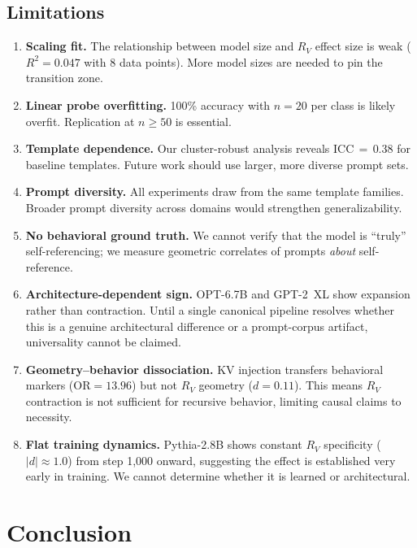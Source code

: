 \documentclass{article}
\newcommand{\RV}{R_V}
\newcommand{\dcohen}{d}
\begin{document}
\subsection{Limitations}

\begin{enumerate}
    \item \textbf{Scaling fit.} The relationship between model size and $\RV$ effect size is weak ($R^2{=}0.047$ with 8 data points). More model sizes are needed to pin the transition zone.
    \item \textbf{Linear probe overfitting.} 100\% accuracy with $n{=}20$ per class is likely overfit. Replication at $n{\geq}50$ is essential.
    \item \textbf{Template dependence.} Our cluster-robust analysis reveals ICC$\,{=}\,$0.38 for baseline templates. Future work should use larger, more diverse prompt sets.
    \item \textbf{Prompt diversity.} All experiments draw from the same template families. Broader prompt diversity across domains would strengthen generalizability.
    \item \textbf{No behavioral ground truth.} We cannot verify that the model is ``truly'' self-referencing; we measure geometric correlates of prompts \emph{about} self-reference.
    \item \textbf{Architecture-dependent sign.} OPT-6.7B and GPT-2~XL show expansion rather than contraction. Until a single canonical pipeline resolves whether this is a genuine architectural difference or a prompt-corpus artifact, universality cannot be claimed.
    \item \textbf{Geometry--behavior dissociation.} KV injection transfers behavioral markers (OR${=}13.96$) but not $\RV$ geometry ($\dcohen{=}0.11$). This means $\RV$ contraction is not sufficient for recursive behavior, limiting causal claims to necessity.
    \item \textbf{Flat training dynamics.} Pythia-2.8B shows constant $\RV$ specificity ($|\dcohen|{\approx}1.0$) from step 1{,}000 onward, suggesting the effect is established very early in training. We cannot determine whether it is learned or architectural.
\end{enumerate}


\section{Conclusion}
\end{document}
